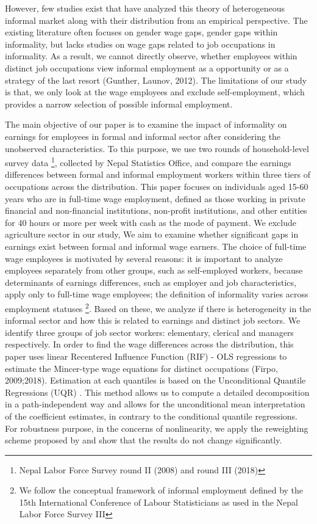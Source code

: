 However, few studies exist that have analyzed this theory of heterogeneous informal market along with their distribution from an empirical perspective. The existing literature often focuses on gender wage gaps, gender gaps within informality,  but lacks studies on wage gaps related to job occupations in informality. As a result, we cannot directly observe, whether employees within distinct job occupations view informal employment as a opportunity or as a strategy of the last resort (Gunther, Launov, 2012). The limitations of our study is that, we only look at the wage employees and exclude self-employment, which provides a narrow selection of possible informal employment.

The main objective of our paper is to examine the impact of informality on earnings for employees in formal and informal sector after considering the unobserved characteristics. To this purpose, we use two rounds of household-level survey data \footnote{Nepal Labor Force Survey round II (2008) and round III (2018)}, collected by Nepal Statistics Office, and compare the earnings differences between formal and informal employment workers within three tiers of occupations across the distribution. This paper focuses on individuals aged 15-60 years who are in full-time wage employment, defined as those working in private financial and non-financial institutions, non-profit institutions, and other entities for 40 hours or more per week with cash as the mode of payment. We exclude agriculture sector in our study, We aim to examine whether significant gaps in earnings exist between formal and informal wage earners. The choice of full-time wage employees is motivated by several reasons: it is important to analyze employees separately from other groups, such as self-employed workers, because determinants of earnings differences, such as employer and job characteristics, apply only to full-time wage employees; the definition of informality varies across employment statuses \footnote{We follow the conceptual framework of informal employment defined by the 15th International Conference of Labour Statisticians as used in the Nepal Labor Force Survey III }. Based on these,  we analyze if there is heterogeneity in the informal sector and how this is related to earnings and distinct job sectors. We identify three groups of job sector workers: elementary, clerical and managers respectively. In order to find the wage differences across the distribution, this paper uses linear Recentered Influence Function (RIF) - OLS regressions to estimate the Mincer-type wage equations for distinct occupations (Firpo, 2009;2018). Estimation at each quantiles is based on the Unconditional Quantile Regressions (UQR) . This method allows us to compute a detailed decomposition in a path-independent way and allows for the unconditional mean interpretation of the coefficient estimates, in contrary to the conditional quantile regressions. For robustness purpose, in the concerns of nonlinearity, we apply the reweighting scheme proposed by \textcite{DiNardo1996} and show that the results do not change significantly.  


